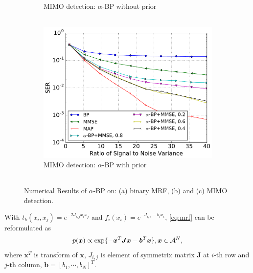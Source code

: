 \documentclass[conference,onecolumn]{IEEEtran}
\begin{document}
\begin{figure}[!ht]
\begin{subfigure}{.33\textwidth}
    \vspace{-0.6cm}
    \caption{MIMO detection: $\alpha$-BP without prior\\~}\label{fig:mimo_a}
  \end{subfigure}
  \begin{subfigure}{.33\textwidth}
    \includegraphics[width=1\linewidth]{figures/prior_mmse_alpha_compare_crop.pdf}
    \vspace{-0.6cm}
    \caption{MIMO detection: $\alpha$-BP with prior\\~}\label{fig:mimo_b}
  \end{subfigure}
  \vspace{-0.3cm}
  \caption{Numerical Results of $\alpha$-BP on: (a) binary MRF, (b) and (c) MIMO detection.}
  \vspace{0.3cm}
  \label{fig:mimo_detection}
\end{figure}
With $t_k(x_i, x_j) = e^{-2J_{i,j}x_i x_j}$ and $f_i(x_i) = e^{-J_{i,i}-b_i x_i}$, \autoref{eq:mrf} can be reformulated as
\begin{equation}
  p(\bm{x}) \propto \exp\{-\bm{x}^{T}\bm{J}\bm{x} - \bm{b}^{T}\bm{x}\}, \bm{x} \in \mathcal{A}^N,
\end{equation}
where $\bm{x}^{T}$ is transform of $\bm{x}$, $J_{i,j}$ is element of symmetrix matrix $\bm{J}$ at $i$-th row and $j$-th column, $\bm{b} = [b_1, \cdots, b_N]^T$.
\end{document}
